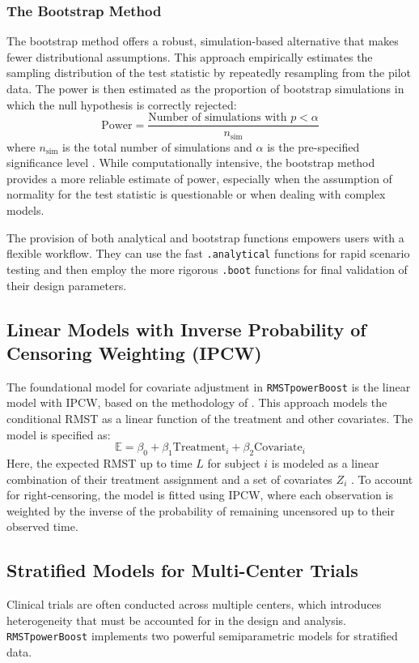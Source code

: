 \documentclass[article]{jss}
\begin{document}
\subsubsection{The Bootstrap Method}
The bootstrap method offers a robust, simulation-based alternative that makes fewer distributional assumptions. This approach empirically estimates the sampling distribution of the test statistic by repeatedly resampling from the pilot data. The power is then estimated as the proportion of bootstrap simulations in which the null hypothesis is correctly rejected:
\begin{equation}
 \text{Power} = \frac{\text{Number of simulations with } p < \alpha}{n_{\text{sim}}}
\end{equation}
where $n_{\text{sim}}$ is the total number of simulations and $\alpha$ is the pre-specified significance level \cite{[1]}. While computationally intensive, the bootstrap method provides a more reliable estimate of power, especially when the assumption of normality for the test statistic is questionable or when dealing with complex models.

The provision of both analytical and bootstrap functions empowers users with a flexible workflow. They can use the fast \texttt{.analytical} functions for rapid scenario testing and then employ the more rigorous \texttt{.boot} functions for final validation of their design parameters.

\subsection{Linear Models with Inverse Probability of Censoring Weighting (IPCW)}
The foundational model for covariate adjustment in \texttt{RMSTpowerBoost} is the linear model with IPCW, based on the methodology of \citet{tian2014}. This approach models the conditional RMST as a linear function of the treatment and other covariates. The model is specified as:
\begin{equation}
\mathbb{E} = \beta_0 + \beta_1 \text{Treatment}_i + \beta_2 \text{Covariate}_{i}
\end{equation}
Here, the expected RMST up to time $L$ for subject $i$ is modeled as a linear combination of their treatment assignment and a set of covariates $Z_i$ \cite{[1]}. To account for right-censoring, the model is fitted using IPCW, where each observation is weighted by the inverse of the probability of remaining uncensored up to their observed time.

\subsection{Stratified Models for Multi-Center Trials}
Clinical trials are often conducted across multiple centers, which introduces heterogeneity that must be accounted for in the design and analysis. \texttt{RMSTpowerBoost} implements two powerful semiparametric models for stratified data.
\end{document}
